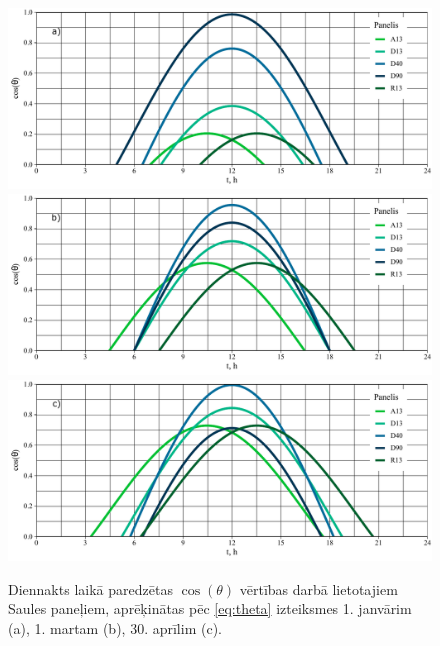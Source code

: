 \begin{figure}[h]
	\centering
	\includegraphics[width=\linewidth]{figures/meteo/jan.pdf}
	\includegraphics[width=\linewidth]{figures/meteo/mar.pdf}
	\includegraphics[width=\linewidth]{figures/meteo/apr.pdf}
	\caption{Diennakts laikā paredzētas $\cos(\theta)$ vērtības darbā lietotajiem Saules paneļiem, aprēķinātas pēc \ref{eq:theta} izteiksmes 1. janvārim (a), 1. martam (b), 30. aprīlim (c).}
	\label{fig:cos-theta}
\end{figure}